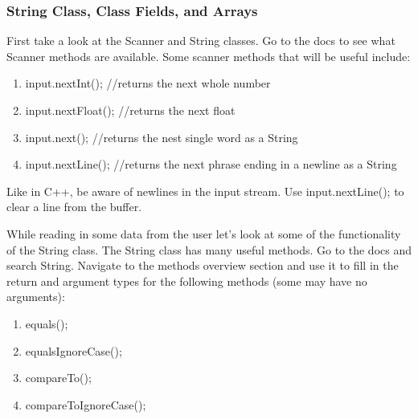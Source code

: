\documentclass[../../main.tex]{subfiles}
\begin{document}
\subsubsection{String Class, Class Fields, and Arrays}
\begin{steps}
      \item First take a look at the Scanner and String classes. Go to the
         docs to see what Scanner methods are available. Some scanner methods
         that will be useful include: 
         \begin{enumerate}[label=\Alph*.]
            \item input.nextInt();     //returns the next whole number
            \item input.nextFloat();   //returns the next float
            \item input.next();        //returns the nest single word as a String
            \item input.nextLine();    //returns the next phrase ending in a newline as a String
         \end{enumerate}
      \item Like in C++, be aware of newlines in the input stream.
         Use input.nextLine(); to clear a line from the buffer.
      \item While reading in some data from the user let's look at some of the functionality of
         the String class. The String class has many useful methods. Go to the docs and search
         String. Navigate to the methods overview section and use it to fill in the return and
         argument types for the following methods (some may have no arguments):
   \begin{enumerate}[label=\Alph*.]
      \item \vspace{.5cm}\underline{\hspace{4cm}}equals(\underline{\hspace{4cm}});
      \item \vspace{.5cm}\underline{\hspace{4cm}}equalsIgnoreCase(\underline{\hspace{4cm}});
      \item \vspace{.5cm}\underline{\hspace{4cm}}compareTo(\underline{\hspace{4cm}});
      \item \vspace{.5cm}\underline{\hspace{4cm}}compareToIgnoreCase(\underline{\hspace{4cm}});

\end{enumerate}
\end{steps}
\end{document}
